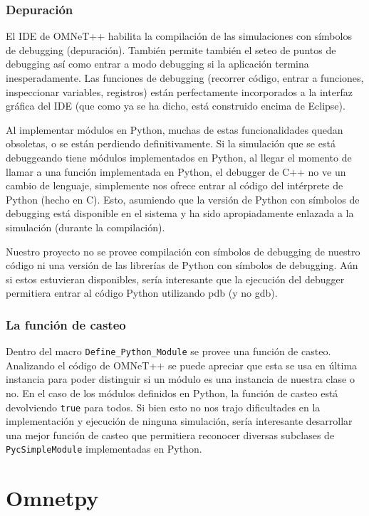 \documentclass[]{article}
\begin{document}
\subsubsection{Depuración}
El IDE de OMNeT++ habilita la compilación de las simulaciones con símbolos de
debugging (depuración). También permite también el seteo de puntos de debugging
así como entrar a modo debugging si la aplicación termina inesperadamente. Las
funciones de debugging (recorrer código, entrar a funciones, inspeccionar
variables, registros) están perfectamente incorporados a la interfaz gráfica
del IDE (que como ya se ha dicho, está construido encima de Eclipse).

Al implementar módulos en Python, muchas de estas funcionalidades quedan
obsoletas, o se están perdiendo definitivamente. Si la simulación que se está
debuggeando tiene módulos implementados en Python, al llegar el momento de
llamar a una función implementada en Python, el debugger de C++ no ve un cambio
de lenguaje, simplemente nos ofrece entrar al código del intérprete de Python
(hecho en C). Esto, asumiendo que la versión de Python con símbolos de
debugging está disponible en el sistema y ha sido apropiadamente enlazada a la
simulación (durante la compilación).

Nuestro proyecto no se provee compilación con símbolos de debugging de nuestro
código ni una versión de las librerías de Python con símbolos de debugging. Aún
si estos estuvieran disponibles, sería interesante que la ejecución del
debugger permitiera entrar al código Python utilizando pdb (y no gdb).

\subsubsection{La función de casteo}

Dentro del macro \verb!Define_Python_Module! se provee una función de casteo.
Analizando el código de OMNeT++ se puede apreciar que esta se usa en última
instancia para poder distinguir si un módulo es una instancia de nuestra clase
o no. En el caso de los módulos definidos en Python, la función de casteo está
devolviendo \verb!true! para todos. Si bien esto no nos trajo dificultades en la
implementación y ejecución de ninguna simulación, sería interesante desarrollar
una mejor función de casteo que permitiera reconocer diversas subclases de
\verb!PycSimpleModule! implementadas en Python.

\section{Omnetpy}
\end{document}
